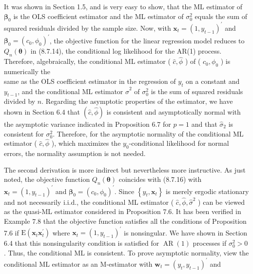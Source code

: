 \documentclass[10pt]{article}
\begin{document}
It was shown in Section 1.5, and is very easy to show, that the ML estimator of $\boldsymbol{\beta}_{0}$ is the OLS coefficient estimator and the ML estimator of $\sigma_{0}^{2}$ equals the sum of squared residuals divided by the sample size. Now, with $\mathbf{x}_{t}=\left(1, y_{t-1}\right)^{\prime}$ and $\boldsymbol{\beta}_{0}=\left(c_{0}, \phi_{0}\right)^{\prime}$, the objective function for the linear regression model reduces to $Q_{n}(\boldsymbol{\theta})$ in (8.7.14), the conditional log likelihood for the AR(1) process. Therefore, algebraically, the conditional ML estimator ( $\hat{c}, \hat{\phi}$ ) of ( $c_{0}, \phi_{0}$ ) is numerically the\\
same as the OLS coefficient estimator in the regression of $y_{t}$ on a constant and $y_{t-1}$, and the conditional ML estimator $\hat{\sigma}^{2}$ of $\sigma_{0}^{2}$ is the sum of squared residuals divided by $n$. Regarding the asymptotic properties of the estimator, we have shown in Section 6.4 that $(\hat{c}, \hat{\phi})$ is consistent and asymptotically normal with the asymptotic variance indicated in Proposition 6.7 for $p=1$ and that $\hat{\sigma}_{2}$ is consistent for $\sigma_{0}^{2}$. Therefore, for the asymptotic normality of the conditional ML estimator ( $\hat{c}, \hat{\phi}$ ), which maximizes the $y_{0}$-conditional likelihood for normal errors, the normality assumption is not needed.

The second derivation is more indirect but nevertheless more instructive. As just noted, the objective function $Q_{n}(\boldsymbol{\theta})$ coincides with (8.7.16) with $\mathbf{x}_{t}=\left(1, y_{t-1}\right)^{\prime}$ and $\boldsymbol{\beta}_{0}=\left(c_{0}, \phi_{0}\right)^{\prime}$. Since $\left\{y_{t}, \mathbf{x}_{t}\right\}$ is merely ergodic stationary and not necessarily i.i.d., the conditional ML estimator ( $\hat{c}, \hat{\phi}, \hat{\sigma}^{2}$ ) can be viewed as the quasi-ML estimator considered in Proposition 7.6. It has been verified in Example 7.8 that the objective function satisfies all the conditions of Proposition 7.6 if $\mathrm{E}\left(\mathbf{x}_{t} \mathbf{x}_{t}^{\prime}\right)$ where $\mathbf{x}_{t}=\left(1, y_{t-1}\right)^{\prime}$ is nonsingular. We have shown in Section 6.4 that this nonsingularity condition is satisfied for $\operatorname{AR}(1)$ processes if $\sigma_{0}^{2}>0$. Thus, the conditional ML is consistent. To prove asymptotic normality, view the conditional ML estimator as an M-estimator with $\mathbf{w}_{t}=\left(y_{t}, y_{t-1}\right)^{\prime}$ and
\end{document}
